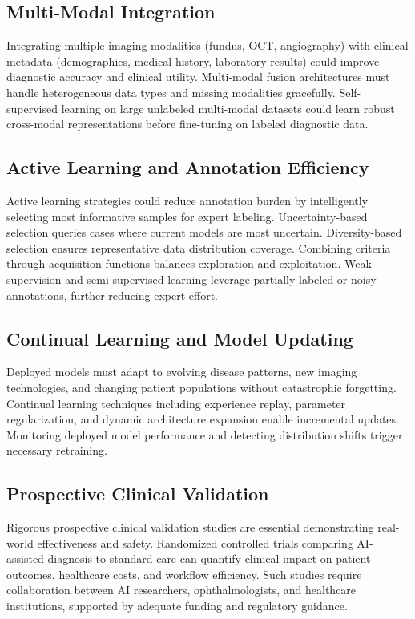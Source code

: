 \subsection{Multi-Modal Integration}

Integrating multiple imaging modalities (fundus, OCT, angiography) with clinical metadata (demographics, medical history, laboratory results) could improve diagnostic accuracy and clinical utility. Multi-modal fusion architectures must handle heterogeneous data types and missing modalities gracefully. Self-supervised learning on large unlabeled multi-modal datasets could learn robust cross-modal representations before fine-tuning on labeled diagnostic data.

\subsection{Active Learning and Annotation Efficiency}

Active learning strategies could reduce annotation burden by intelligently selecting most informative samples for expert labeling. Uncertainty-based selection queries cases where current models are most uncertain. Diversity-based selection ensures representative data distribution coverage. Combining criteria through acquisition functions balances exploration and exploitation. Weak supervision and semi-supervised learning leverage partially labeled or noisy annotations, further reducing expert effort.

\subsection{Continual Learning and Model Updating}

Deployed models must adapt to evolving disease patterns, new imaging technologies, and changing patient populations without catastrophic forgetting. Continual learning techniques including experience replay, parameter regularization, and dynamic architecture expansion enable incremental updates. Monitoring deployed model performance and detecting distribution shifts trigger necessary retraining.

\subsection{Prospective Clinical Validation}

Rigorous prospective clinical validation studies are essential demonstrating real-world effectiveness and safety. Randomized controlled trials comparing AI-assisted diagnosis to standard care can quantify clinical impact on patient outcomes, healthcare costs, and workflow efficiency. Such studies require collaboration between AI researchers, ophthalmologists, and healthcare institutions, supported by adequate funding and regulatory guidance.


